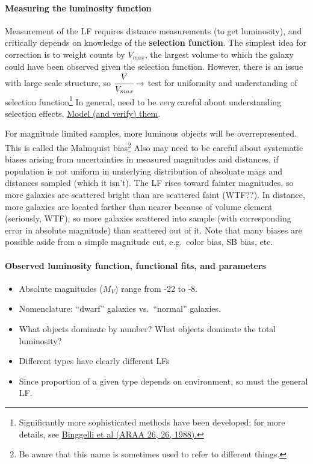 \documentclass{article}
\newcommand{\mynotes}[1]{\textcolor{cadmiumgreen}{#1}}
\begin{document}
\paragraph{Measuring the luminosity function}
Measurement of the LF requires distance measurements (to get luminosity), and
critically depends on knowledge of the \textbf{selection function}.
The simplest idea for correction is to weight counts by $V_{max}$, the largest
volume to which the galaxy could have been observed given the selection
function. However, there is an issue with large scale structure, so
$\cfrac{V}{V_{max}} \rightarrow$ test for uniformity and understanding
of selection function\footnote{
    Significantly more sophisticated methods have been developed; for more details, see
    \href{http://adsabs.harvard.edu/cgi-bin/nph-bib_query?bibcode=1988ARA\%26A..26..509}
    {Binggelli et al (ARAA 26, 26, 1988).}
}
In general, need to be \emph{very} careful about understanding selection effects.
\href{http://astronomy.nmsu.edu/holtz/a555/resources/lf_selection.gif}
{Model (and verify) them}.

\mynotes{For magnitude limited samples, more luminous objects will be overrepresented.
This is called the Malmquist bias\footnote{Be aware that this name is sometimes
used to refer to different things.} Also may need to be careful about
systematic biases arising from uncertainties in measured magnitudes and
distances, if population is not uniform in underlying distribution of absoluate
mags and distances sampled (which it isn't). The LF rises toward fainter
magnitudes, so more galaxies are scattered bright than are scattered faint
(WTF??). In distance, more galaxies are located farther than nearer
because of volume element (seriously, WTF), so more galaxies
scattered into sample (with corresponding error in absolute magnitude) than
scattered out of it. Note that many biases are possible aside from a simple
magnitude cut, e.g.\ color bias, SB bias, etc.}

\paragraph{Observed luminosity function, functional fits, and parameters}
\begin{itemize}
    \item Absolute magnitudes ($M_{V}$) range from -22 to -8.
    \item Nomenclature: ``dwarf'' galaxies vs.\ ``normal'' galaxies.
    \item What objects dominate by number? What objects dominate the
        total luminosity?
    \item Different types have clearly different LFs
    \item Since proportion of a given type depends on environment, so
        must the general LF.
\end{itemize}
\end{document}
